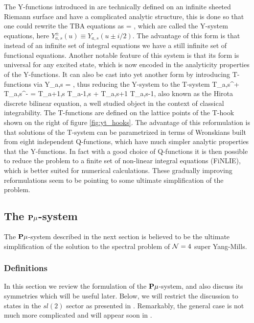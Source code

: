 The Y-functions introduced in  are technically defined on an infinite sheeted Riemann surface and have a complicated analytic structure, this is done so that one could rewrite the TBA equations as
\beq
	 = ,
\eeq
which are called the Y-system equations, here $Y^\pm_{a,s}(u) \equiv Y_{a,s}(u \pm i/2)$.
The advantage of this form is that instead of an infinite set of integral equations we have a still infinite set of functional equations.
Another notable feature of this system is that its form is universal for any excited state, which is now encoded in the analyticity properties of the Y-functions. 
It can also be cast into yet another form by introducing T-functions via
\beq
	Y_{a,s} = ,
\eeq
thus reducing the Y-system to the T-system
\beq
	T_{a,s}^+ T_{a,s}^- = T_{a+1,s} T_{a-1,s} + T_{a,s+1} T_{a,s-1},
\eeq
also known as the Hirota discrete bilinear equation, a well studied object in the context of classical integrability.
The T-functions are defined on the lattice points of the T-hook shown on the right of figure \ref{fig:yt_hooks}.
The advantage of this reformulation is that solutions of the T-system can be parametrized in terms of Wronskians built from eight independent Q-functions, which have much simpler analytic properties that the Y-functions.
In fact with a good choice of Q-functions it is then possible to reduce the problem to a finite set of non-linear integral equations (FiNLIE), which is better suited for numerical calculations.
These gradually improving reformulations seem to be pointing to some ultimate simplification of the problem.

\subsection{The ${\bf P}\mu$-system}
\label{sec:pmu_system}

The ${\bf P}\mu$-system described in the next section is believed to be the ultimate simplification of the solution to the spectral problem of $\mathcal{N}=4$ super Yang-Mills.

\subsubsection{Definitions}


In this section we review the formulation of the ${\bf P}\mu$-system, and also discuss its symmetries which will be useful later.
Below, we will restrict the discussion to states in the $sl(2)$ sector as presented in \cite{Gromov:2013pga}.
Remarkably, the general case is not much more complicated and will appear soon in \cite{Gromov:2014caa}.

